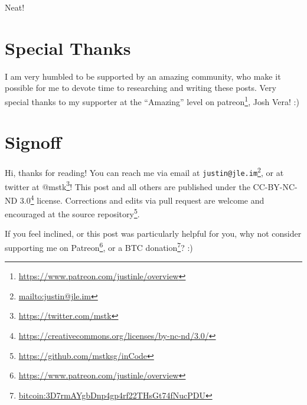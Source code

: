 \documentclass[]{article}
\renewcommand{\href}[2]{#2\footnote{\url{#1}}}
\begin{document}
Neat!

\section{Special Thanks}\label{special-thanks}

I am very humbled to be supported by an amazing community, who make it possible
for me to devote time to researching and writing these posts. Very special
thanks to my supporter at the ``Amazing'' level on
\href{https://www.patreon.com/justinle/overview}{patreon}, Josh Vera! :)

\section{Signoff}\label{signoff}

Hi, thanks for reading! You can reach me via email at
\href{mailto:justin@jle.im}{\nolinkurl{justin@jle.im}}, or at twitter at
\href{https://twitter.com/mstk}{@mstk}! This post and all others are published
under the \href{https://creativecommons.org/licenses/by-nc-nd/3.0/}{CC-BY-NC-ND
3.0} license. Corrections and edits via pull request are welcome and encouraged
at \href{https://github.com/mstksg/inCode}{the source repository}.

If you feel inclined, or this post was particularly helpful for you, why not
consider \href{https://www.patreon.com/justinle/overview}{supporting me on
Patreon}, or a \href{bitcoin:3D7rmAYgbDnp4gp4rf22THsGt74fNucPDU}{BTC donation}?
:)
\end{document}
